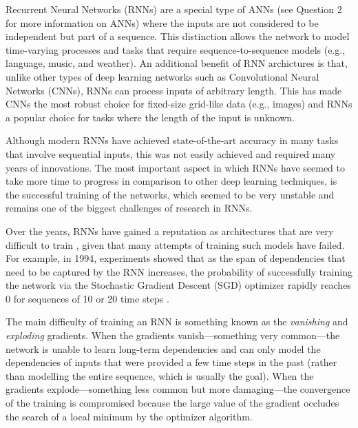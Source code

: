 

Recurrent Neural Networks (RNNs) are a special type of ANNs
(see Question 2 for more information on ANNs) where the
inputs are not considered to be independent but part of a
sequence. This distinction allows the network to model
time-varying processes and tasks that require
sequence-to-sequence models (e.g., language, music, and
weather). An additional benefit of RNN archictures is that,
unlike other types of deep learning networks such as
Convolutional Neural Networks (CNNs), RNNs can process
inputs of arbitrary length. This has made CNNs the most
robust choice for fixed-size grid-like data (e.g., images)
and RNNs a popular choice for tasks where the length of the
input is unknown.

Although modern RNNs have achieved state-of-the-art accuracy
in many tasks that involve sequential inputs, this was not
easily achieved and required many years of innovations. The
most important aspect in which RNNs have seemed to take more
time to progress in comparison to other deep learning
techniques, is the successful training of the networks,
which seemed to be very unstable and remains one of the
biggest challenges of research in RNNs.


Over the years, RNNs have gained a reputation as
architectures that are very difficult to train
\parencite{pascanu2013difficulty}, given that many attempts
of training such models have failed. For example, in 1994,
experiments showed that as the span of dependencies that
need to be captured by the RNN increases, the probability of
successfully training the network via the Stochastic
Gradient Descent (SGD) optimizer rapidly reaches 0 for
sequences of 10 or 20 time steps
\parencite{bengio1994learning}.

The main difficulty of training an RNN is something known as
the \emph{vanishing} and \emph{exploding} gradients. When
the gradients vanish---something very common---the network
is unable to learn long-term dependencies and can only model
the dependencies of inputs that were provided a few time
steps in the past (rather than modelling the entire
sequence, which is usually the goal). When the gradients
explode---something less common but more damaging---the
convergence of the training is compromised because the large
value of the gradient occludes the search of a local minimum
by the optimizer algorithm.

